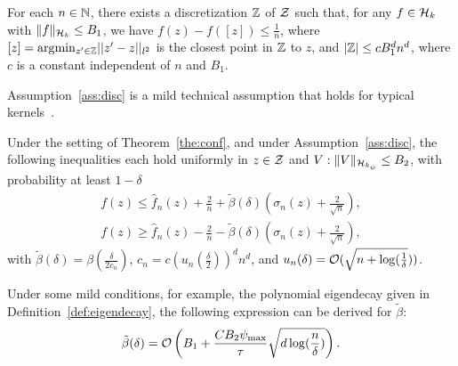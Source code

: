 \begin{assumption}\label{ass:disc}
For each $n\in\mathbb{N}$, there exists a discretization $\mathbb{Z}$ of $\mathcal{Z}$ such that, for any $f\in \mathcal{H}_k$ with $\|f\|_{\mathcal{H}_k}\le B_1$, we have $f(z) - f([z])\le \frac{1}{n}$, where $[z] = {\arg}{\min}_{ z'\in \mathbb{Z}}||z'-z||_{l^2}$ is the closest point in $\mathbb{Z}$ to $z$, and $|\mathbb{Z}|\le cB_1^dn^{d}$, where $c$ is a constant independent of $n$ and $B_1$.
\end{assumption}
Assumption~\ref{ass:disc} is a mild technical assumption that holds for typical kernels~\citep{srinivas2009gaussian, chowdhury2017kernelized, vakili2021optimal}.

\begin{corollary}\label{Cor:cont}
Under the setting of Theorem~\ref{the:conf}, and under Assumption~\ref{ass:disc}, the following inequalities each hold uniformly in $z\in\mathcal{Z}$ and $V: \|V\|_{\mathcal{H}_{k_\psi}}\le B_2$, with probability at least $1-\delta$
\begin{align*}
    f(z)  \le \hat{f}_n(z) + \frac{2}{n} +  \tilde{\beta}(\delta) (\sigma_n(z)+\frac{2}{\sqrt{n}}), \\
    f(z)  \ge\hat{f}_n(z) -\frac{2}{n} -\tilde{\beta}(\delta) (\sigma_n(z)+\frac{2}{\sqrt{n}}),
\end{align*}
with $\tilde{\beta}(\delta)=\beta(\frac{\delta}{2c_n})$, $c_n=c(u_n(\frac{\delta}{2}))^dn^d$, and $u_n(\delta) = \mathcal{O}(\sqrt{n+\log(\frac{1}{\delta}}))$.

\end{corollary}


\begin{remark}
    Under some mild conditions, for example, the polynomial eigendecay given in Definition~\ref{def:eigendecay}, the following expression can be derived for $\tilde{\beta}$:
    \begin{equation}
        \tilde{\beta}(\delta)= \mathcal{O}\left(B_1+\frac{C B_2 \psi_{\max}}{\tau}\sqrt{d\log(\frac{n}{\delta})}\right).
    \end{equation}
\end{remark}

